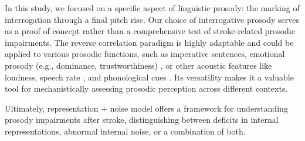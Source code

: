 In this study, we focused on a specific aspect of linguistic prosody: the marking of interrogation through a final pitch rise. Our choice of interrogative prosody serves as a proof of concept rather than a comprehensive test of stroke-related prosodic impairments. The reverse correlation paradigm is highly adaptable and could be applied to various prosodic functions, such as imperative sentences, emotional prosody (e.g., dominance, trustworthiness) \cite{ponsot_cracking_2018}, or other acoustic features like loudness, speech rate \cite{goupil_listeners_2021}, and phonological cues \cite{osses_prosodic_2023}. Its versatility makes it a valuable tool for mechanistically assessing prosodic perception across different contexts. 

Ultimately, representation + noise model offers a framework for understanding prosody impairments after stroke, distinguishing between deficits in internal representations, abnormal internal noise, or a combination of both.

